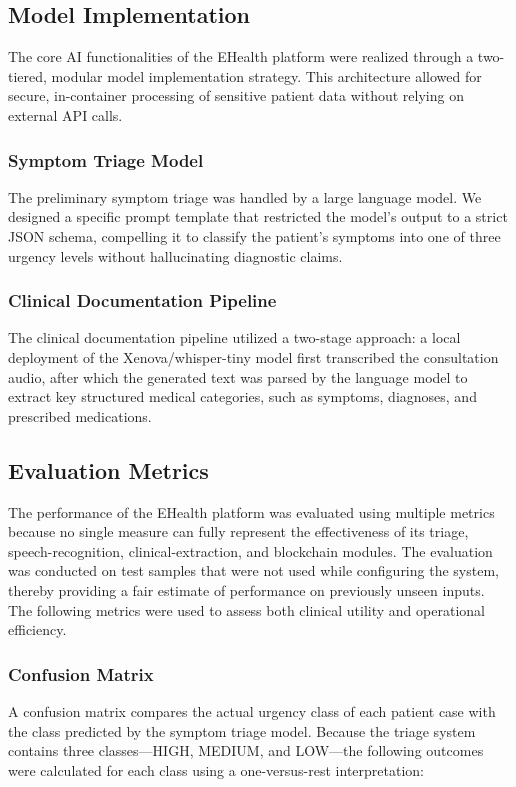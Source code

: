 \subsection{Model Implementation}
The core AI functionalities of the EHealth platform were realized through a two-tiered, modular model implementation strategy. This architecture allowed for secure, in-container processing of sensitive patient data without relying on external API calls.

\subsubsection{Symptom Triage Model}
The preliminary symptom triage was handled by a large language model. We designed a specific prompt template that restricted the model's output to a strict JSON schema, compelling it to classify the patient's symptoms into one of three urgency levels without hallucinating diagnostic claims.

\subsubsection{Clinical Documentation Pipeline}
The clinical documentation pipeline utilized a two-stage approach: a local deployment of the Xenova/whisper-tiny model first transcribed the consultation audio, after which the generated text was parsed by the language model to extract key structured medical categories, such as symptoms, diagnoses, and prescribed medications.

\subsection{Evaluation Metrics}
The performance of the EHealth platform was evaluated using multiple metrics because no single measure can fully represent the effectiveness of its triage, speech-recognition, clinical-extraction, and blockchain modules. The evaluation was conducted on test samples that were not used while configuring the system, thereby providing a fair estimate of performance on previously unseen inputs. The following metrics were used to assess both clinical utility and operational efficiency.

\subsubsection{Confusion Matrix}
A confusion matrix compares the actual urgency class of each patient case with the class predicted by the symptom triage model. Because the triage system contains three classes---HIGH, MEDIUM, and LOW---the following outcomes were calculated for each class using a one-versus-rest interpretation:


